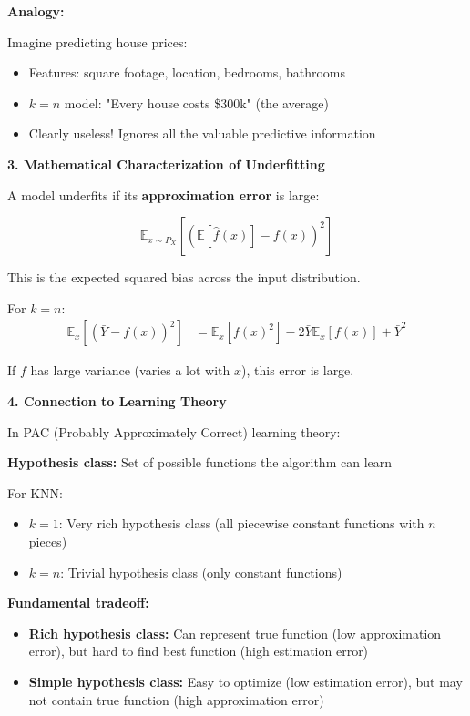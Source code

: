 \documentclass[12pt]{article}
\begin{document}
\begin{explanation}
\textbf{Analogy:}

Imagine predicting house prices:
\begin{itemize}
    \item Features: square footage, location, bedrooms, bathrooms
    \item \(k=n\) model: "Every house costs \$300k" (the average)
    \item Clearly useless! Ignores all the valuable predictive information
\end{itemize}

\textbf{3. Mathematical Characterization of Underfitting}

A model underfits if its \textbf{approximation error} is large:

\[
\mathbb{E}_{x \sim P_X}[(\mathbb{E}[\hat{f}(x)] - f(x))^2]
\]

This is the expected squared bias across the input distribution.

For \(k=n\):
\begin{align*}
\mathbb{E}_{x}[(\bar{Y} - f(x))^2] &= \mathbb{E}_x[f(x)^2] - 2\bar{Y}\mathbb{E}_x[f(x)] + \bar{Y}^2
\end{align*}

If \(f\) has large variance (varies a lot with \(x\)), this error is large.

\textbf{4. Connection to Learning Theory}

In PAC (Probably Approximately Correct) learning theory:

\textbf{Hypothesis class:} Set of possible functions the algorithm can learn

For KNN:
\begin{itemize}
    \item \(k=1\): Very rich hypothesis class (all piecewise constant functions with \(n\) pieces)
    \item \(k=n\): Trivial hypothesis class (only constant functions)
\end{itemize}

\textbf{Fundamental tradeoff:}
\begin{itemize}
    \item \textbf{Rich hypothesis class:} Can represent true function (low approximation error), but hard to find best function (high estimation error)
    \item \textbf{Simple hypothesis class:} Easy to optimize (low estimation error), but may not contain true function (high approximation error)
\end{itemize}


\end{explanation}
\end{document}
